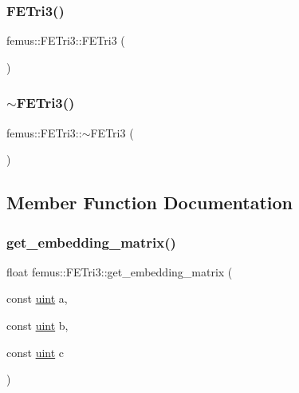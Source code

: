 \subsubsection{\texorpdfstring{F\+E\+Tri3()}{FETri3()}}
{\footnotesize\ttfamily femus\+::\+F\+E\+Tri3\+::\+F\+E\+Tri3 (\begin{DoxyParamCaption}{ }\end{DoxyParamCaption})}

\mbox{\label{classfemus_1_1_f_e_tri3_a140b1aabebf8a03b3131cec1e9d83bd2}} 
\subsubsection{\texorpdfstring{$\sim$\+F\+E\+Tri3()}{~FETri3()}}
{\footnotesize\ttfamily femus\+::\+F\+E\+Tri3\+::$\sim$\+F\+E\+Tri3 (\begin{DoxyParamCaption}{ }\end{DoxyParamCaption})}



\subsection{Member Function Documentation}
\mbox{\label{classfemus_1_1_f_e_tri3_ad9dd0717627d89b61a2536d9da42f17e}} 
\subsubsection{\texorpdfstring{get\+\_\+embedding\+\_\+matrix()}{get\_embedding\_matrix()}}
{\footnotesize\ttfamily float femus\+::\+F\+E\+Tri3\+::get\+\_\+embedding\+\_\+matrix (\begin{DoxyParamCaption}\item[{const \mbox{\hyperlink{_typedefs_8hpp_a91ad9478d81a7aaf2593e8d9c3d06a14}{uint}}}]{a,  }\item[{const \mbox{\hyperlink{_typedefs_8hpp_a91ad9478d81a7aaf2593e8d9c3d06a14}{uint}}}]{b,  }\item[{const \mbox{\hyperlink{_typedefs_8hpp_a91ad9478d81a7aaf2593e8d9c3d06a14}{uint}}}]{c }\end{DoxyParamCaption})\hspace{0.3cm}{\ttfamily [virtual]}}



